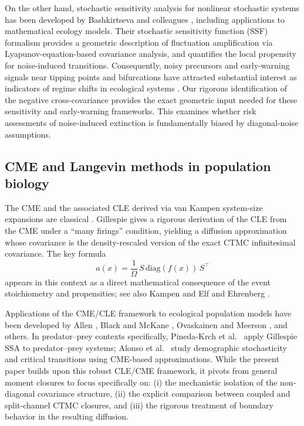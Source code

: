\documentclass[pdflatex,sn-mathphys-ay]{sn-jnl}
\theoremstyle{thmstyleone}
\theoremstyle{definition}
\theoremstyle{remark}
\begin{document}
On the other hand, stochastic sensitivity analysis for nonlinear stochastic systems has been developed by Bashkirtseva and colleagues \citep{bashkirtseva_stochastic_2004,bashkirtseva_stochastic_2014,bashkirtseva_stochastic_2018}, including applications to mathematical ecology models. 
Their stochastic sensitivity function (SSF) formalism provides a geometric description of fluctuation amplification via Lyapunov-equation-based covariance analysis, and quantifies the local propensity for noise-induced transitions.
Consequently, noisy precursors and early-warning signals near tipping points and bifurcations have attracted substantial interest as indicators of regime shifts in ecological systems \citep{scheffer_early-warning_2009,dakos_slowing_2008,boettiger_quantifying_2012,carpenter_early_2011,lenton_early_2011,boettiger_no_2013}. 
Our rigorous identification of the negative cross-covariance provides the exact geometric input needed for these sensitivity and early-warning frameworks.
This examines whether risk assessments of noise-induced extinction is fundamentally biased by diagonal-noise assumptions.

\subsection{CME and Langevin methods in population biology}

The CME and the associated CLE derived via van Kampen system-size expansions are classical \citep{van_kampen_stochastic_2007,gardiner_stochastic_2009,gillespie_chemical_2000}. 
Gillespie \citep{gillespie_chemical_2000} gives a rigorous derivation of the CLE from the CME under a ``many firings'' condition, yielding a diffusion approximation whose covariance is the density-rescaled version of the exact CTMC infinitesimal covariance. 
The key formula
\[
a(x)=\frac{1}{\Omega}\,S\,\mathrm{diag}(f(x))\,S^\top
\]
appears in this context as a direct mathematical consequence of the event stoichiometry and propensities; see also Kampen \citep{van_kampen_stochastic_2007} and Elf and Ehrenberg \citep{elf_fast_2003}.

Applications of the CME/CLE framework to ecological population models have been developed by Allen \citep{allen_introduction_2010}, Black and McKane \citep{black_stochastic_2012}, Ovaskainen and Meerson \citep{ovaskainen_stochastic_2010}, and others. 
In predator--prey contexts specifically, Pineda-Krch et al.\ \citep{pineda-krch_gillespiessa_2009} apply Gillespie SSA to predator--prey systems; Alonso et al.\ \citep{alonso_stochastic_2007} study demographic stochasticity and critical transitions using CME-based approximations. 
While the present paper builds upon this robust CLE/CME framework, it pivots from general moment closures to focus specifically on: 
(i) the mechanistic isolation of the non-diagonal covariance structure, 
(ii) the explicit comparison between coupled and split-channel CTMC closures, 
and (iii) the rigorous treatment of boundary behavior in the resulting diffusion.
\end{document}
